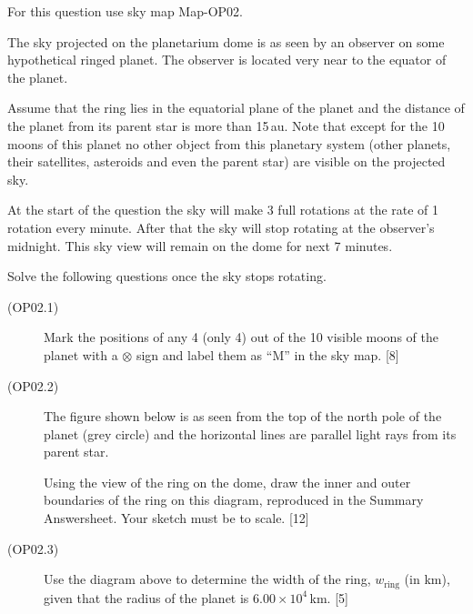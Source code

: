 For this question use sky map Map-OP02.

The sky projected on the planetarium dome is as seen by an observer on some
hypothetical ringed planet. The observer is located very near to the equator
of the planet.

Assume that the ring lies in the equatorial plane of the planet and the
distance of the planet from its parent star is more than 15\,au. Note that
except for the 10 moons of this planet no other object from this planetary
system (other planets, their satellites, asteroids and even the parent star)
are visible on the projected sky.

At the start of the question the sky will make 3 full rotations at the rate
of 1 rotation every minute. After that the sky will stop rotating at the
observer's midnight. This sky view will remain on the dome for next 7
minutes.

Solve the following questions once the sky stops rotating.


\begin{description}
\item[(OP02.1)] Mark the positions of any 4 (only 4) out of the 10 visible
  moons of the planet with a $\otimes$ sign and label them as ``M'' in the
  sky map. \hfill[8]
\item[(OP02.2)] The figure shown below is as seen from the top of the north
  pole of the planet (grey circle) and the horizontal lines are parallel
  light rays from its parent star.


  Using the view of the ring on the dome, draw the inner and outer boundaries
  of the ring on this diagram, reproduced in the Summary Answersheet. Your
  sketch must be to scale. \hfill[12]
\item[(OP02.3)] Use the diagram above to determine the width of the ring,
  $w_{\mathrm{ring}}$ (in km), given that the radius of the planet is
  $6.00 \times 10^4$\,km. \hfill[5]
\end{description}
